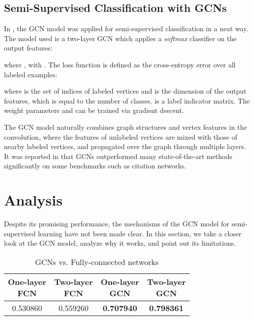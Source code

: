 \documentclass[letterpaper]{article} \usepackage{aaai18}  \usepackage{times}  \usepackage{helvet}  \usepackage{courier}  \usepackage{url}  \usepackage{graphicx}  \usepackage{algorithm}
\begin{document}
\subsection{Semi-Supervised Classification with GCNs}





In \cite{kipf2016semi}, the GCN model was applied for semi-supervised classification in a neat way. The model used is a two-layer GCN which applies a \emph{softmax} classifier on the output features:

where ,  with . The loss function is defined as the cross-entropy error over all labeled examples:

where  is the set of indices of labeled vertices and  is the dimension of the output features, which is equal to the number of classes.  is a label indicator matrix. The weight parameters  and  can be trained via gradient descent.

The GCN model naturally combines graph structures and vertex features in the convolution, where the features of unlabeled vertices are mixed with those of nearby labeled vertices, and propagated over the graph through multiple layers. It was reported in \cite{kipf2016semi} that GCNs outperformed many state-of-the-art methods significantly on some benchmarks such as citation networks.






\section{Analysis}\label{sec:Analysis}

Despite its promising performance, the mechanisms of the GCN model for semi-supervised learning have not been made clear. In this section, we take a closer look at the GCN model, analyze why it works, and point out its limitations.





\begin{table}
\centering
\caption{GCNs vs. Fully-connected networks}\label{tb:one_layer_gcn}
\begin{tabular}{cccc}
  \thead{ One-layer \\ FCN} & \thead{ Two-layer \\ FCN} & \thead{ One-layer \\ GCN} & \thead{ Two-layer \\ GCN}\\
  \midrule
   0.530860 &  0.559260 &  \textbf{0.707940} &  \textbf{0.798361}\\
\end{tabular}
\end{table}
\end{document}
